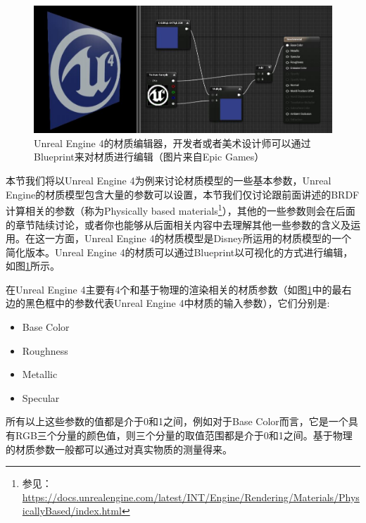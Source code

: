 \begin{figure}
\begin{fullwidth}
	\includegraphics[width=1.0\thewidth]{figures/intro/material-model}
	\caption{Unreal Engine 4的材质编辑器，开发者或者美术设计师可以通过Blueprint来对材质进行编辑（图片来自Epic Games）}
	\label{f:intro-ue4-materials}
\end{fullwidth}
\end{figure}


本节我们将以Unreal Engine 4为例来讨论材质模型的一些基本参数，Unreal Engine的材质模型包含大量的参数可以设置，本节我们仅讨论跟前面讲述的BRDF计算相关的参数（称为Physically based materials\footnote{参见：\url{https://docs.unrealengine.com/latest/INT/Engine/Rendering/Materials/PhysicallyBased/index.html}}），其他的一些参数则会在后面的章节陆续讨论，或者你也能够从后面相关内容中去理解其他一些参数的含义及运用。在这一方面，Unreal Engine 4的材质模型是Disney\cite{a:PhysicallyBasedShadingatDisney}所运用的材质模型的一个简化版本。Unreal Engine 4的材质可以通过Blueprint以可视化的方式进行编辑，如图\ref{f:intro-ue4-materials}所示。




在Unreal Engine 4主要有4个和基于物理的渲染相关的材质参数（如图\ref{f:intro-ue4-materials}中的最右边的黑色框中的参数代表Unreal Engine 4中材质的输入参数），它们分别是:

\begin{itemize}
	\item Base Color
	\item Roughness
	\item Metallic
	\item Specular
\end{itemize}

所有以上这些参数的值都是介于0和1之间，例如对于Base Color而言，它是一个具有RGB三个分量的颜色值，则三个分量的取值范围都是介于0和1之间。基于物理的材质参数一般都可以通过对真实物质的测量得来。


